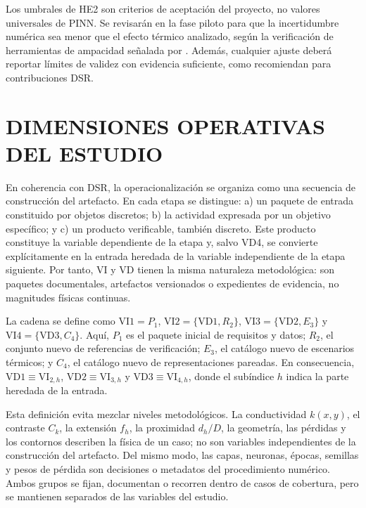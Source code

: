 \documentclass[11pt,a4paper,oneside]{report}
\newcommand{\kx}{k(x,y)}
\begin{document}
Los umbrales de HE2 son criterios de aceptación del proyecto, no valores universales de PINN. Se revisarán en la fase piloto para que la incertidumbre numérica sea menor que el efecto térmico analizado, según la verificación de herramientas de ampacidad señalada por \textcite[93--99]{cigre2025}. Además, cualquier ajuste deberá reportar límites de validez con evidencia suficiente, como recomiendan \textcite[350--351]{gregor2013} para contribuciones DSR.

\section{DIMENSIONES OPERATIVAS DEL ESTUDIO}
\label{sec:dimensiones-operativas}

En coherencia con DSR, la operacionalización se organiza como una secuencia de construcción del artefacto. En cada etapa se distingue: a) un paquete de entrada constituido por objetos discretos; b) la actividad expresada por un objetivo específico; y c) un producto verificable, también discreto. Este producto constituye la variable dependiente de la etapa y, salvo VD4, se convierte explícitamente en la entrada heredada de la variable independiente de la etapa siguiente. Por tanto, VI y VD tienen la misma naturaleza metodológica: son paquetes documentales, artefactos versionados o expedientes de evidencia, no magnitudes físicas continuas.

La cadena se define como $\mathrm{VI1}=P_1$, $\mathrm{VI2}=\{\mathrm{VD1},R_2\}$, $\mathrm{VI3}=\{\mathrm{VD2},E_3\}$ y $\mathrm{VI4}=\{\mathrm{VD3},C_4\}$. Aquí, $P_1$ es el paquete inicial de requisitos y datos; $R_2$, el conjunto nuevo de referencias de verificación; $E_3$, el catálogo nuevo de escenarios térmicos; y $C_4$, el catálogo nuevo de representaciones pareadas. En consecuencia, $\mathrm{VD1}\equiv\mathrm{VI}_{2,h}$, $\mathrm{VD2}\equiv\mathrm{VI}_{3,h}$ y $\mathrm{VD3}\equiv\mathrm{VI}_{4,h}$, donde el subíndice $h$ indica la parte heredada de la entrada.

Esta definición evita mezclar niveles metodológicos. La conductividad $\kx$, el contraste $C_k$, la extensión $f_h$, la proximidad $d_h/D$, la geometría, las pérdidas y los contornos describen la física de un caso; no son variables independientes de la construcción del artefacto. Del mismo modo, las capas, neuronas, épocas, semillas y pesos de pérdida son decisiones o metadatos del procedimiento numérico. Ambos grupos se fijan, documentan o recorren dentro de casos de cobertura, pero se mantienen separados de las variables del estudio.
\end{document}
